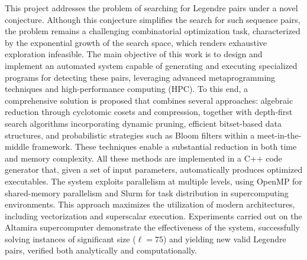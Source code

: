 This project addresses the problem of searching for Legendre pairs under a novel conjecture. Although this conjecture simplifies the search for such sequence pairs, the problem remains a challenging combinatorial optimization task, characterized by the exponential growth of the search space, which renders exhaustive exploration infeasible.
The main objective of this work is to design and implement an automated system capable of generating and executing specialized programs for detecting these pairs, leveraging advanced metaprogramming techniques and high-performance computing (HPC).
To this end, a comprehensive solution is proposed that combines several approaches: algebraic reduction through cyclotomic cosets and compression, together with depth-first search algorithms incorporating dynamic pruning, efficient bitset-based data structures, and probabilistic strategies such as Bloom filters within a meet-in-the-middle framework. These techniques enable a substantial reduction in both time and memory complexity.
All these methods are implemented in a C++ code generator that, given a set of input parameters, automatically produces optimized executables. The system exploits parallelism at multiple levels, using OpenMP for shared-memory parallelism and Slurm for task distribution in supercomputing environments. This approach maximizes the utilization of modern architectures, including vectorization and superscalar execution.
Experiments carried out on the Altamira supercomputer demonstrate the effectiveness of the system, successfully solving instances of significant size ($\ell = 75$) and yielding new valid Legendre pairs, verified both analytically and computationally.